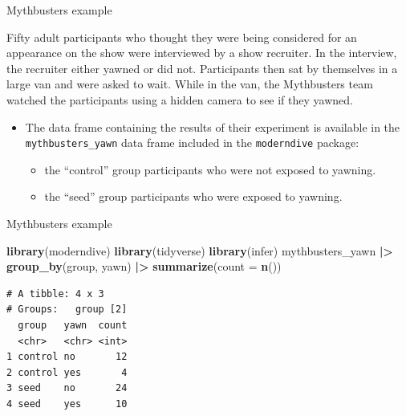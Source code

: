 \documentclass[
  ignorenonframetext,
]{beamer}
\newenvironment{Shaded}{\begin{snugshade}}{\end{snugshade}}
\newcommand{\AttributeTok}[1]{\textcolor[rgb]{0.13,0.29,0.53}{#1}}
\newcommand{\FunctionTok}[1]{\textcolor[rgb]{0.13,0.29,0.53}{\textbf{#1}}}
\newcommand{\NormalTok}[1]{#1}
\newcommand{\SpecialCharTok}[1]{\textcolor[rgb]{0.81,0.36,0.00}{\textbf{#1}}}
\providecommand{\tightlist}{%
  \setlength{\itemsep}{0pt}\setlength{\parskip}{0pt}}
\begin{document}
\begin{frame}[fragile]{Mythbusters example}
\label{mythbusters-example}
\begin{tcolorbox}
Fifty adult participants who thought they were being considered for an appearance on the show were interviewed by a show recruiter. In the interview, the recruiter either yawned or did not. Participants then sat by themselves in a large van and were asked to wait. While in the van, the Mythbusters team watched the participants using a hidden camera to see if they yawned. 
\end{tcolorbox}

\begin{itemize}
\item
  The data frame containing the results of their experiment is available
  in the \texttt{mythbusters\_yawn} data frame included in the
  \texttt{moderndive} package:

  \begin{itemize}
  \tightlist
  \item
    the ``control'' group participants who were not exposed to yawning.
  \item
    the ``seed'' group participants who were exposed to yawning.
  \end{itemize}
\end{itemize}
\end{frame}

\begin{frame}[fragile]{Mythbusters example}
\label{mythbusters-example-1}
\small

\begin{Shaded}
\begin{Highlighting}[]
\FunctionTok{library}\NormalTok{(moderndive)}
\FunctionTok{library}\NormalTok{(tidyverse)}
\FunctionTok{library}\NormalTok{(infer)}
\NormalTok{mythbusters\_yawn }\SpecialCharTok{|\textgreater{}} 
  \FunctionTok{group\_by}\NormalTok{(group, yawn) }\SpecialCharTok{|\textgreater{}} 
  \FunctionTok{summarize}\NormalTok{(}\AttributeTok{count =} \FunctionTok{n}\NormalTok{())}
\end{Highlighting}
\end{Shaded}

\begin{verbatim}
# A tibble: 4 x 3
# Groups:   group [2]
  group   yawn  count
  <chr>   <chr> <int>
1 control no       12
2 control yes       4
3 seed    no       24
4 seed    yes      10
\end{verbatim}

\normalsize
\end{frame}
\end{document}

